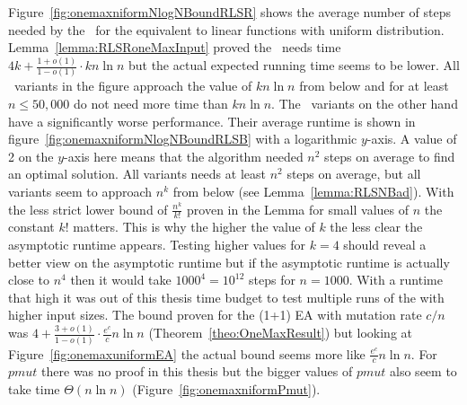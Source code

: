 Figure~\ref{fig:onemaxniformNlogNBoundRLSR} shows the average number of steps needed by the \RLSR~for the equivalent to linear functions with uniform distribution.
Lemma~\ref{lemma:RLSRoneMaxInput} proved the \RLSR~needs time $4k+\frac{1+o(1)}{1-o(1)}\cdot kn\ln n$ but the actual expected running time seems to be lower.
All \RLSR[k]~variants in the figure approach the value of $kn\ln n$ from below and for at least $n\le50,000$ do not need more time than $kn\ln n$.
The \RLSN[k]~variants on the other hand have a significantly worse performance.
Their average runtime is shown in figure~\ref{fig:onemaxniformNlogNBoundRLSB} with a logarithmic $y$-axis.
A value of 2 on the $y$-axis here means that the algorithm needed $n^2$ steps on average to find an optimal solution.
All \RLSN[k] variants needs at least $n^2$ steps on average, but all variants seem to approach $n^k$ from below (see Lemma~\ref{lemma:RLSNBad}).
With the less strict lower bound of $\frac{n^k}{k!}$ proven in the Lemma for small values of $n$ the constant $k!$ matters.
This is why the higher the value of $k$ the less clear the asymptotic runtime appears.
Testing higher values for $k=4$ should reveal a better view on the asymptotic runtime but if the asymptotic runtime is actually close to $n^4$ then it would take $1000^4=10^{12}$ steps for $n=1000$.
With a runtime that high it was out of this thesis time budget to test multiple runs of the \RLSN[4] with higher input sizes.
The bound proven for the (1+1) EA with mutation rate $c/n$ was \(4+\frac{3+o(1)}{1-o(1)}\cdot \frac{e^c}{c}n\ln n\) (Theorem~\ref{theo:OneMaxResult}) but looking at Figure~\ref{fig:onemaxuniformEA} the actual bound seems more like \(\frac{e^c}{c}n\ln n\).
For $pmut$ there was no proof in this thesis but the bigger values of $pmut$ also seem to take time $\Theta(n\ln n)$ (Figure~\ref{fig:onemaxniformPmut}).

